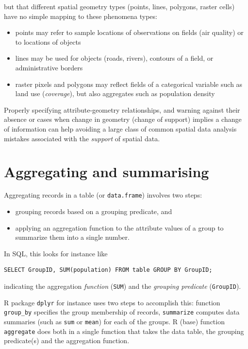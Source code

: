 \documentclass[]{book}
\providecommand{\tightlist}{%
  \setlength{\itemsep}{0pt}\setlength{\parskip}{0pt}}
\begin{document}
but that different spatial geometry types (points, lines, polygons,
raster cells) have no simple mapping to these phenomena types:

\begin{itemize}
\tightlist
\item
  points may refer to sample locations of observations on fields (air quality) or to locations of objects
\item
  lines may be used for objects (roads, rivers), contours of a field, or administrative borders
\item
  raster pixels and polygons may reflect fields of a categorical
  variable such as land use (\emph{coverage}), but also aggregates such
  as population density
\end{itemize}

Properly specifying attribute-geometry relationships, and warning
against their absence or cases when change in geometry (change
of support) implies a change of information can help avoiding a
large class of common spatial data analysis mistakes \citep{stasch2014}
associated with the \emph{support} of spatial data.

\hypertarget{aggregating-and-summarising}{%
\section{Aggregating and summarising}\label{aggregating-and-summarising}}

Aggregating records in a table (or \texttt{data.frame}) involves two steps:

\begin{itemize}
\tightlist
\item
  grouping records based on a grouping predicate, and
\item
  applying an aggregation function to the attribute values of a
  group to summarize them into a single number.
\end{itemize}

In SQL, this looks for instance like

\begin{verbatim}
SELECT GroupID, SUM(population) FROM table GROUP BY GroupID;
\end{verbatim}

indicating the aggregation \emph{function} (\texttt{SUM}) and the
\emph{grouping predicate} (\texttt{GroupID}).

R package \texttt{dplyr} for instance uses two steps to accomplish this:
function \texttt{group\_by} specifies the group membership of records,
\texttt{summarize} computes data summaries (such as \texttt{sum} or \texttt{mean}) for
each of the groups. R (base) function \texttt{aggregate} does both in a
single function that takes the data table, the grouping predicate(s)
and the aggregation function.
\end{document}
